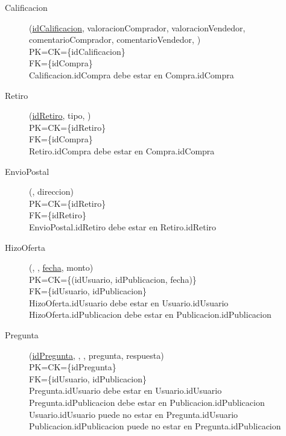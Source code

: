 \begin{description}

 \item[Calificacion](\underline{idCalificacion}, valoracionComprador, valoracionVendedor, comentarioComprador, comentarioVendedor, )\\
PK=CK=\{idCalificacion\}\\
FK=\{idCompra\}\\
Calificacion.idCompra debe estar en Compra.idCompra

 \item[Retiro](\underline{idRetiro}, tipo, )\\
PK=CK=\{idRetiro\}\\
FK=\{idCompra\}\\
Retiro.idCompra debe estar en Compra.idCompra

 \item[EnvioPostal](\underline{}, direccion)\\
PK=CK=\{idRetiro\}\\
FK=\{idRetiro\}\\
EnvioPostal.idRetiro debe estar en Retiro.idRetiro

  \item[HizoOferta](\underline{}, \underline{}, \underline{fecha}, monto)\\
PK=CK=\{(idUsuario, idPublicacion, fecha)\}\\
FK=\{idUsuario, idPublicacion\}\\
HizoOferta.idUsuario debe estar en Usuario.idUsuario\\
HizoOferta.idPublicacion debe estar en Publicacion.idPublicacion

  \item[Pregunta](\underline{idPregunta}, , , pregunta, respuesta)\\
PK=CK=\{idPregunta\}\\
FK=\{idUsuario, idPublicacion\}\\
Pregunta.idUsuario debe estar en Usuario.idUsuario\\
Pregunta.idPublicacion debe estar en Publicacion.idPublicacion\\
Usuario.idUsuario puede no estar en Pregunta.idUsuario\\
Publicacion.idPublicacion puede no estar en Pregunta.idPublicacion


\end{description}
